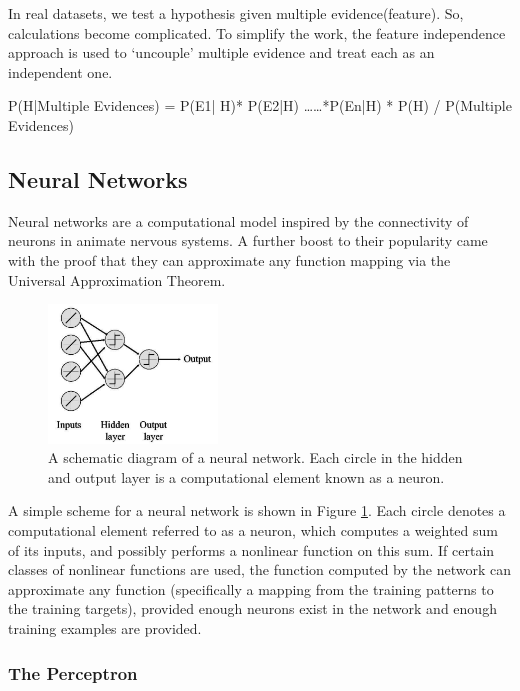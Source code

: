 \documentclass[12pt]{article}
\numberwithin{equation}{section}
\numberwithin{table}{section}
\numberwithin{figure}{section}
\begin{document}
In real datasets, we test a hypothesis given multiple evidence(feature). So, calculations become complicated. To simplify the work, the feature independence approach is used to ‘uncouple’ multiple evidence and treat each as an independent one.

P(H|Multiple Evidences) =  P(E1| H)* P(E2|H) ……*P(En|H) * P(H) / P(Multiple Evidences)



\subsection{Neural Networks} \label{neuralnetwork}

Neural networks are a computational model inspired by the connectivity of neurons in animate nervous systems.
A further boost to their popularity came with the proof that they can approximate any function mapping via the Universal Approximation Theorem. 

\begin{figure}[H] \centering
	\includegraphics[width=0.4\textwidth]{image5.png}
	\caption{A schematic diagram of a neural network. Each circle in the hidden and output layer is a computational element known as a neuron. }
	\label{figure5}
\end{figure}


A simple scheme for a neural network is shown in Figure \ref{figure5}. Each circle denotes a computational element referred to as a neuron, which computes a weighted sum of its inputs, and possibly performs a nonlinear function on this sum. If certain classes of nonlinear functions are used, the function computed by the network can approximate any function (specifically a mapping from the training patterns to the training targets), provided enough neurons exist in the network and enough training examples are provided.


\subsubsection{The Perceptron} \label{perc}
\end{document}
